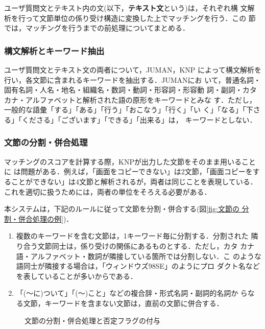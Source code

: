 ユーザ質問文とテキスト内の文(以下，{\bf テキスト文}という)は，それぞれ構
文解析を行って文節単位の係り受け構造に変換した上でマッチングを行う．この
節では，マッチングを行うまでの前処理についてまとめる．


\subsubsection{構文解析とキーワード抽出}

ユーザ質問文とテキスト文の両者について，JUMAN\cite{JUMAN}，KNP\cite{KNP} 
によって構文解析を行い，各文節に含まれるキーワードを抽出する．JUMANにお
いて，普通名詞・固有名詞・人名・地名・組織名・数詞・動詞・形容詞・形容動
詞・副詞・カタカナ・アルファベットと解析された語の原形をキーワードとみな
す．ただし，一般的な語彙「する」「ある」「行う」「おこなう」「行く」「い
く」「なる」「下さる」「くださる」「ございます」「できる」「出来る」は，
キーワードとしない．


\subsubsection{文節の分割・併合処理} \label{subsubsec:文節の分割・併合処理}

マッチングのスコアを計算する際，KNPが出力した文節をそのまま用いることに
は問題がある．例えば，「画面をコピーできない」は2文節，「画面コピーをす
ることができない」は4文節と解析されるが，両者は同じことを表現している．
これを適切に扱うためには，両者の単位をそろえる必要がある．

本システムは，下記のルールに従って文節を分割・併合する(図\ref{fig:文節の
分割・併合処理の例})．
\begin{enumerate}
 \item 複数のキーワードを含む文節は，1キーワード毎に分割する．分割された
       隣り合う文節同士は，係り受けの関係にあるものとする．ただし，カタ
       カナ語・アルファベット・数詞が隣接している箇所では分割しない．こ
       のような語同士が隣接する場合は，「ウィンドウズ98SE」のようにプロ
       ダクト名などを表していることが多いからである．

 \item 「(〜に)ついて」「(〜)こと」などの複合辞・形式名詞・副詞的名詞か
       らなる文節，キーワードを含まない文節は，直前の文節に併合する．
\end{enumerate}



\begin{figure}
 \begin{center}
 \caption{文節の分割・併合処理と否定フラグの付与}
 \label{fig:文節の分割・併合処理の例}
  \end{center}
\end{figure}



